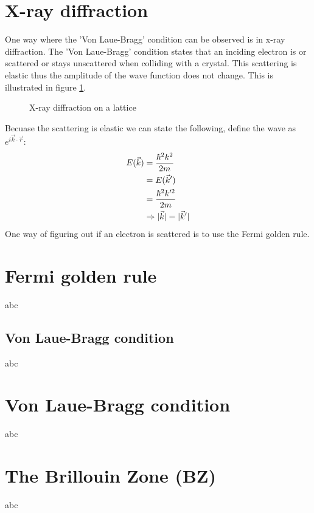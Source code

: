 \section{X-ray diffraction}
One way where the 'Von Laue-Bragg' condition can be observed is in x-ray diffraction. The 'Von Laue-Bragg' condition states that an inciding electron is or scattered or stays unscattered when colliding with a crystal. This scattering is elastic thus the amplitude of the wave function does not change. This is illustrated in figure \ref{fig:vonlaue}.
\begin{figure}[b]
    \centering
    \caption{X-ray diffraction on a lattice}
    \label{fig:vonlaue}
\end{figure}
Becuase the scattering is elastic we can state the following, define the wave as $e^{i\vec{k}\cdot\vec{r}}$:
\begin{align}
	E(\vec{k}) &= \frac{\hbar^2k^2}{2m}\\
	&= E(\vec{k}')\\
	&= \frac{\hbar^2k'^2}{2m}\\
	&\Rightarrow \lvert\vec{k}\rvert = \lvert\vec{k}'\rvert
\end{align}
One way of figuring out if an electron is scattered is to use the Fermi golden rule.
\section{Fermi golden rule}
abc

\subsection{Von Laue-Bragg condition} \label{sec:bragg}
abc

\section{Von Laue-Bragg condition}
abc

\section{The Brillouin Zone (BZ)} \label{sec:Brillouin}
abc
